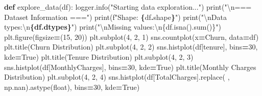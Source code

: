\documentclass[preprint, 3p,
authoryear]{elsarticle} %
\newenvironment{Shaded}{\begin{snugshade}}{\end{snugshade}}
\newcommand{\BuiltInTok}[1]{#1}
\newcommand{\CharTok}[1]{\textcolor[rgb]{0.31,0.60,0.02}{#1}}
\newcommand{\DecValTok}[1]{\textcolor[rgb]{0.00,0.00,0.81}{#1}}
\newcommand{\KeywordTok}[1]{\textcolor[rgb]{0.13,0.29,0.53}{\textbf{#1}}}
\newcommand{\NormalTok}[1]{#1}
\newcommand{\OperatorTok}[1]{\textcolor[rgb]{0.81,0.36,0.00}{\textbf{#1}}}
\newcommand{\SpecialCharTok}[1]{\textcolor[rgb]{0.81,0.36,0.00}{\textbf{#1}}}
\newcommand{\SpecialStringTok}[1]{\textcolor[rgb]{0.31,0.60,0.02}{#1}}
\newcommand{\StringTok}[1]{\textcolor[rgb]{0.31,0.60,0.02}{#1}}
\newcommand{\VariableTok}[1]{\textcolor[rgb]{0.00,0.00,0.00}{#1}}
\begin{document}
\begin{Shaded}
\begin{Highlighting}[]
\KeywordTok{def}\NormalTok{ explore\_data(df):}
\NormalTok{    logger.info(}\StringTok{"Starting data exploration..."}\NormalTok{)}
    \BuiltInTok{print}\NormalTok{(}\StringTok{"}\CharTok{\textbackslash{}n}\StringTok{=== Dataset Information ==="}\NormalTok{)}
    \BuiltInTok{print}\NormalTok{(}\SpecialStringTok{f"Shape: }\SpecialCharTok{\{}\NormalTok{df}\SpecialCharTok{.}\NormalTok{shape}\SpecialCharTok{\}}\SpecialStringTok{"}\NormalTok{)}
    \BuiltInTok{print}\NormalTok{(}\StringTok{"}\CharTok{\textbackslash{}n}\StringTok{Data types:}\CharTok{\textbackslash{}n}\SpecialCharTok{\{df.dtypes\}}\StringTok{"}\NormalTok{)}
    \BuiltInTok{print}\NormalTok{(}\StringTok{"}\CharTok{\textbackslash{}n}\StringTok{Missing values:}\CharTok{\textbackslash{}n}\StringTok{\{df.isna().sum()\}"}\NormalTok{)}
\NormalTok{    plt.figure(figsize}\OperatorTok{=}\NormalTok{(}\DecValTok{15}\NormalTok{, }\DecValTok{20}\NormalTok{))}
\NormalTok{    plt.subplot(}\DecValTok{4}\NormalTok{, }\DecValTok{2}\NormalTok{, }\DecValTok{1}\NormalTok{)}
\NormalTok{    sns.countplot(x}\OperatorTok{=}\StringTok{\textquotesingle{}Churn\textquotesingle{}}\NormalTok{, data}\OperatorTok{=}\NormalTok{df)}
\NormalTok{    plt.title(}\StringTok{\textquotesingle{}Churn Distribution\textquotesingle{}}\NormalTok{)}
\NormalTok{    plt.subplot(}\DecValTok{4}\NormalTok{, }\DecValTok{2}\NormalTok{, }\DecValTok{2}\NormalTok{)}
\NormalTok{    sns.histplot(df[}\StringTok{\textquotesingle{}tenure\textquotesingle{}}\NormalTok{], bins}\OperatorTok{=}\DecValTok{30}\NormalTok{, kde}\OperatorTok{=}\VariableTok{True}\NormalTok{)}
\NormalTok{    plt.title(}\StringTok{\textquotesingle{}Tenure Distribution\textquotesingle{}}\NormalTok{)}
\NormalTok{    plt.subplot(}\DecValTok{4}\NormalTok{, }\DecValTok{2}\NormalTok{, }\DecValTok{3}\NormalTok{)}
\NormalTok{    sns.histplot(df[}\StringTok{\textquotesingle{}MonthlyCharges\textquotesingle{}}\NormalTok{], bins}\OperatorTok{=}\DecValTok{30}\NormalTok{, kde}\OperatorTok{=}\VariableTok{True}\NormalTok{)}
\NormalTok{    plt.title(}\StringTok{\textquotesingle{}Monthly Charges Distribution\textquotesingle{}}\NormalTok{)}
\NormalTok{    plt.subplot(}\DecValTok{4}\NormalTok{, }\DecValTok{2}\NormalTok{, }\DecValTok{4}\NormalTok{)}
\NormalTok{    sns.histplot(df[}\StringTok{\textquotesingle{}TotalCharges\textquotesingle{}}\NormalTok{].replace(}\StringTok{\textquotesingle{} \textquotesingle{}}\NormalTok{, np.nan).astype(}\BuiltInTok{float}\NormalTok{), bins}\OperatorTok{=}\DecValTok{30}\NormalTok{, kde}\OperatorTok{=}\VariableTok{True}\NormalTok{)}

\end{Highlighting}
\end{Shaded}
\end{document}
